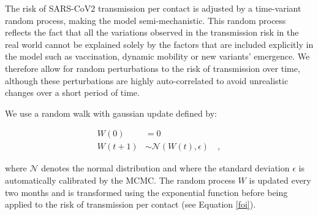The risk of SARS-CoV2 transmission per contact is adjusted by a time-variant random process, making
the model semi-mechanistic. This random process reflects the fact that all the variations observed in the transmission
risk in the real world cannot be explained solely by the factors that are included explicitly in the model such as vaccination, dynamic mobility or new variants' emergence.
We therefore allow for random perturbations to the risk of transmission over time, although these perturbations are highly auto-correlated
to avoid unrealistic changes over a short period of time.

We use a random walk with gaussian update defined by:

\begin{equation}
    \label{eq:random_process}
    \begin{split}
    W(0) & = 0 \\
    W(t+1) & \sim \mathcal{N}(W(t), \epsilon) \quad ,
    \end{split}
\end{equation}

where $\mathcal{N}$ denotes the normal distribution and where the standard deviation $\epsilon$ is automatically calibrated by the MCMC.
The random process $W$ is updated every two months and is transformed using the exponential function before being applied to the risk of transmission per contact (see Equation \ref{foi}).